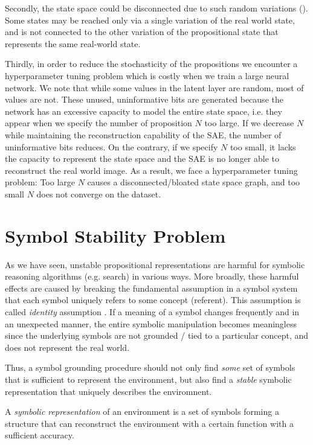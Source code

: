 Secondly, the state space could be disconnected due to such random variations ().
Some states may be reached only via a single variation of the real world state, and is not connected to the
other variation of the propositional state that represents the same real-world state.

Thirdly, in order to reduce the stochasticity of the propositions we encounter a hyperparameter tuning problem
which is costly when we train a large neural network.
We note that while some values in the latent layer are random, most of values are not.
These unused, uninformative bits are generated because the network has an excessive capacity to 
model the entire state space, i.e. they appear when we specify the number of proposition $N$ too large.
If we decrease $N$ while maintaining the reconstruction capability of the SAE, the number of uninformative bits
reduces.
On the contrary, if we specify $N$ too small, it lacks the capacity to represent the state space
and the SAE is no longer able to reconstruct the
real world image.
As a result, we face a hyperparameter tuning problem: Too large $N$ causes a disconnected/bloated state space graph,
and too small $N$ does not converge on the dataset.

\section{Symbol Stability Problem}

As we have seen, unstable propositional representations are harmful for symbolic reasoning algorithms (e.g. search)
in various ways.
More broadly,
these harmful effects are caused by breaking the fundamental assumption in a symbol system
that each symbol uniquely refers to some concept (referent). This assumption is called \emph{identity} assumption \cite{}.
If a meaning of a symbol changes frequently and in an unexpected manner, the entire symbolic manipulation becomes meaningless
since the underlying symbols are not grounded / tied to a particular concept, and does not represent the real world.

Thus, a symbol grounding procedure should not only find \emph{some} set of symbols that is sufficient to represent the
environment, but also find a \emph{stable} symbolic representation that uniquely describes the enviromnent.

\begin{defi}
A \emph{symbolic representation} of an environment is a set of symbols forming a structure
that can reconstruct the environment with a certain function with a sufficient accuracy.
\end{defi}

